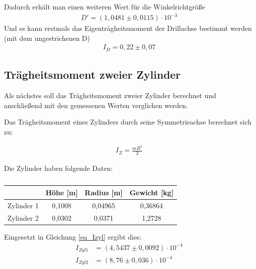 Dadurch erhält man einen weiteren Wert für die Winkelrichtgröße
\begin{align*}
D'=(1,0481\pm 0,0115) \cdot10^{-3}
\end{align*}
Und es kann erstmals das Eigenträgheitsmoment der Drillachse bestimmt werden (mit dem ungestrichenen D)
\begin{align*}
I_D=0,22 \pm 0,07
\end{align*}

\subsection{Trägheitsmoment zweier Zylinder}
Als nächstes soll das Trägheitsmoment zweier Zylinder berechnet und anschließend mit den gemessenen Werten verglichen werden.

Das Trägheitsmoment eines Zylinders durch seine Symmetrieachse berechnet sich zu:

\begin{align}
I_{Z}=\frac{mR^2}{2}
\label{eq_Izyl}
\end{align}

Die Zylinder haben folgende Daten:
\begin{table}[htbp]
\begin{tabular}{|c|c|c|c|}
\hline 
 & Höhe [m] & Radius [m] & Gewicht [kg]\\ 
\hline 
Zylinder 1 & 0,1008 & 0,04965 & 0,36864 \\ 
\hline 
Zylinder 2 & 0,0302 & 0,0371 & 1,2728 \\ 
\hline 
\end{tabular} 
\caption{}
\end{table}

Eingesetzt in Gleichung \eqref{eq_Izyl} ergibt dies:
\begin{align*}
I_{Zyl 1}&=(4,5437\pm0,0092)\cdot10^{-4}\\
I_{Zyl 2}&=(8,76\pm0,036)\cdot10^{-4}
\end{align*}

